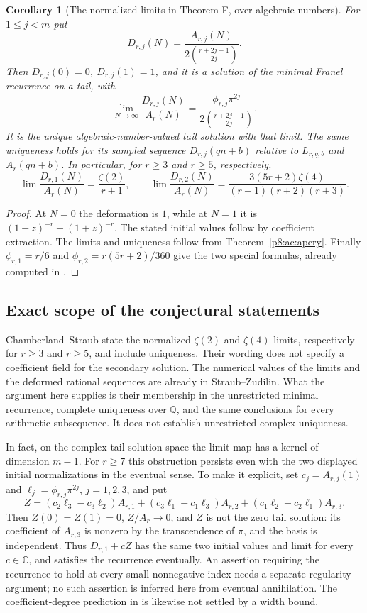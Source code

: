 \documentclass[11pt,a4paper]{article}
\newtheorem{corollary}[theorem]{Corollary}
\theoremstyle{definition}
\theoremstyle{remark}
\numberwithin{equation}{section}
\begin{document}
\begin{corollary}[The normalized limits in Theorem F, over algebraic numbers]
\label{p8:ac:normalized}
For $1\le j<m$ put
\[
 D_{r,j}(N)=\frac{A_{r,j}(N)}{2\binom{r+2j-1}{2j}}.
\]
Then $D_{r,j}(0)=0$, $D_{r,j}(1)=1$, and it is a solution of the
minimal Franel recurrence on a tail, with
\[
 \lim_{N\to\infty}\frac{D_{r,j}(N)}{A_r(N)}
 =\frac{\phi_{r,j}\pi^{2j}}{2\binom{r+2j-1}{2j}}.
\]
It is the unique algebraic-number-valued tail solution with that
limit. The same uniqueness holds for its sampled sequence
$D_{r,j}(qn+b)$ relative to $L_{r;q,b}$ and $A_r(qn+b)$.
In particular, for $r\ge3$ and $r\ge5$, respectively,
\[
 \lim\frac{D_{r,1}(N)}{A_r(N)}=\frac{\zeta(2)}{r+1},
 \qquad
 \lim\frac{D_{r,2}(N)}{A_r(N)}
 =\frac{3(5r+2)\zeta(4)}{(r+1)(r+2)(r+3)}.
\]
\end{corollary}
\begin{proof}
At $N=0$ the deformation is $1$, while at $N=1$ it is
$(1-z)^{-r}+(1+z)^{-r}$. The stated initial values follow by
coefficient extraction. The limits and uniqueness follow from
Theorem~\ref{p8:ac:apery}. Finally
$\phi_{r,1}=r/6$ and $\phi_{r,2}=r(5r+2)/360$ give the two
special formulas, already computed in \cite[Examples 1.5 and 1.7]{p8:AC_SZ}.
\end{proof}

\subsection{Exact scope of the conjectural statements}

Chamberland--Straub \cite[Conjectures 9 and 11]{p8:AC_CS} state the
normalized $\zeta(2)$ and $\zeta(4)$ limits, respectively for
$r\ge3$ and $r\ge5$, and include uniqueness. Their wording does not
specify a coefficient field for the secondary solution. The numerical
values of the limits and the deformed rational sequences are already
in Straub--Zudilin. What the argument here supplies is their membership
in the unrestricted minimal recurrence, complete uniqueness over
$\overline{\mathbb Q}$, and the same conclusions for every arithmetic
subsequence. It does not establish unrestricted complex uniqueness.

In fact, on the complex tail solution space the limit map has a
kernel of dimension $m-1$. For $r\ge7$ this obstruction persists
even with the two displayed initial normalizations in the eventual
sense. To make it explicit, set $c_j=A_{r,j}(1)$ and
$\ell_j=\phi_{r,j}\pi^{2j}$, $j=1,2,3$, and put
\[
 Z=(c_2\ell_3-c_3\ell_2)A_{r,1}
   +(c_3\ell_1-c_1\ell_3)A_{r,2}
   +(c_1\ell_2-c_2\ell_1)A_{r,3}.
\]
Then $Z(0)=Z(1)=0$, $Z/A_r\to0$, and $Z$ is not the zero tail
solution: its coefficient of $A_{r,3}$ is nonzero by the transcendence
of $\pi$, and the basis is independent. Thus $D_{r,1}+cZ$ has the
same two initial values and limit for every $c\in\mathbb C$, and
satisfies the recurrence eventually. An assertion requiring the
recurrence to hold at every small nonnegative index needs a separate
regularity argument; no such assertion is inferred here from eventual
annihilation. The coefficient-degree prediction in
\cite[Remark 4.1]{p8:AC_SZ} is likewise not settled by a width bound.
\end{document}
